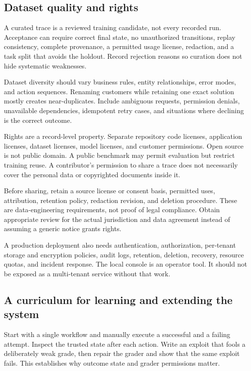 \documentclass[
  11pt,
  letterpaper,
]{article}
\begin{document}
\subsection{Dataset quality and
rights}\label{dataset-quality-and-rights}

A curated trace is a reviewed training candidate, not every recorded
run. Acceptance can require correct final state, no unauthorized
transitions, replay consistency, complete provenance, a permitted usage
license, redaction, and a task split that avoids the holdout. Record
rejection reasons so curation does not hide systematic weaknesses.

Dataset diversity should vary business rules, entity relationships,
error modes, and action sequences. Renaming customers while retaining
one exact solution mostly creates near-duplicates. Include ambiguous
requests, permission denials, unavailable dependencies, idempotent retry
cases, and situations where declining is the correct outcome.

Rights are a record-level property. Separate repository code licenses,
application licenses, dataset licenses, model licenses, and customer
permissions. Open source is not public domain. A public benchmark may
permit evaluation but restrict training reuse. A contributor's
permission to share a trace does not necessarily cover the personal data
or copyrighted documents inside it.

Before sharing, retain a source license or consent basis, permitted
uses, attribution, retention policy, redaction revision, and deletion
procedure. These are data-engineering requirements, not proof of legal
compliance. Obtain appropriate review for the actual jurisdiction and
data agreement instead of assuming a generic notice grants rights.

A production deployment also needs authentication, authorization,
per-tenant storage and encryption policies, audit logs, retention,
deletion, recovery, resource quotas, and incident response. The local
console is an operator tool. It should not be exposed as a multi-tenant
service without that work.

\subsection{A curriculum for learning and extending the
system}\label{a-curriculum-for-learning-and-extending-the-system}

Start with a single workflow and manually execute a successful and a
failing attempt. Inspect the trusted state after each action. Write an
exploit that fools a deliberately weak grade, then repair the grader and
show that the same exploit fails. This establishes why outcome state and
grader permissions matter.
\end{document}
